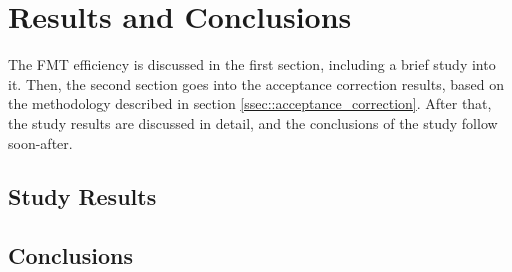 \section{Results and Conclusions} \label{sec::results_and_conclusions}
    The FMT efficiency is discussed in the first section, including a brief study into it.
    Then, the second section goes into the acceptance correction results, based on the methodology described in section \ref{ssec::acceptance_correction}.
    After that, the study results are discussed in detail, and the conclusions of the study follow soon-after.

    
    

\subsection{Study Results}

\subsection{Conclusions}
